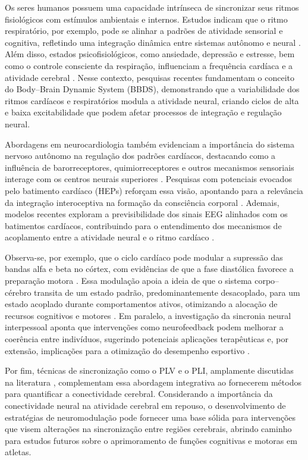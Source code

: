 Os seres humanos possuem uma capacidade intrínseca de sincronizar seus ritmos fisiológicos com estímulos ambientais e internos. Estudos indicam que o ritmo respiratório, por exemplo, pode se alinhar a padrões de atividade sensorial e cognitiva, refletindo uma integração dinâmica entre sistemas autônomo e neural \cite{haas1985effects}. Além disso, estados psicofisiológicos, como ansiedade, depressão e estresse, bem como o controle consciente da respiração, influenciam a frequência cardíaca e a atividade cerebral \cite{criscuolo2022cognitioncognition}. Nesse contexto, pesquisas recentes fundamentam o conceito do Body–Brain Dynamic System (BBDS), demonstrando que a variabilidade dos ritmos cardíacos e respiratórios modula a atividade neural, criando ciclos de alta e baixa excitabilidade que podem afetar processos de integração e regulação neural.

Abordagens em neurocardiologia também evidenciam a importância do sistema nervoso autônomo na regulação dos padrões cardíacos, destacando como a influência de barorreceptores, quimiorreceptores e outros mecanismos sensoriais interage com os centros neurais superiores \cite{marcondes2024linguagem}. Pesquisas com potenciais evocados pelo batimento cardíaco (HEPs) reforçam essa visão, apontando para a relevância da integração interoceptiva na formação da consciência corporal \cite{park2018neural, banelli2020skipping, mackinnon2013utilizing}. Ademais, modelos recentes exploram a previsibilidade dos sinais EEG alinhados com os batimentos cardíacos, contribuindo para o entendimento dos mecanismos de acoplamento entre a atividade neural e o ritmo cardíaco \cite{vergara2024exploring}.

Observa-se, por exemplo, que o ciclo cardíaco pode modular a supressão das bandas alfa e beta no córtex, com evidências de que a fase diastólica favorece a preparação motora \cite{lai2024cardiac}. Essa modulação apoia a ideia de que o sistema corpo–cérebro transita de um estado padrão, predominantemente desacoplado, para um estado acoplado durante comportamentos ativos, otimizando a alocação de recursos cognitivos e motores \cite{criscuolo2022cognition}. Em paralelo, a investigação da sincronia neural interpessoal aponta que intervenções como neurofeedback podem melhorar a coerência entre indivíduos, sugerindo potenciais aplicações terapêuticas e, por extensão, implicações para a otimização do desempenho esportivo \cite{boecker2024interpersonal, konrad2024interpersonal}.

Por fim, técnicas de sincronização como o PLV e o PLI, amplamente discutidas na literatura \cite{seraj2018}, complementam essa abordagem integrativa ao fornecerem métodos para quantificar a conectividade cerebral. Considerando a importância da conectividade neural na atividade cerebral em repouso, o desenvolvimento de estratégias de neuromodulação pode fornecer uma base sólida para intervenções que visem alterações na sincronização entre regiões cerebrais, abrindo caminho para estudos futuros sobre o aprimoramento de funções cognitivas e motoras em atletas.

